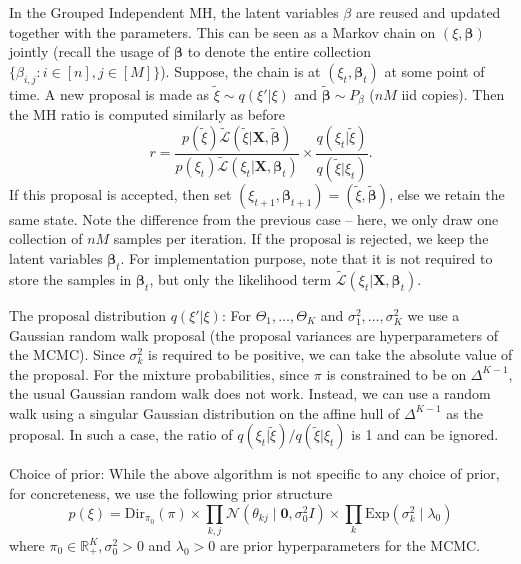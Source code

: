 \documentclass[bj,authoryear]{imsart}
\theoremstyle{plain}
\theoremstyle{remark}
\def\bX{\mathbf{X}}
\def\bbeta{{\boldsymbol\beta}}
\def\bbR{\mathbb{R}}
\def\cL{\mathcal{L}}
\def\cN{\mathcal{N}}
\begin{document}
\begin{appendix}
In the Grouped Independent MH, the latent variables $\beta$ are reused and updated together with the parameters. This can be seen as a Markov chain on $(\xi,\bbeta)$ jointly (recall the usage of $\bbeta$ to denote the entire collection $\{\beta_{i,j}:i\in[n],j\in[M]\}$). Suppose, the chain is at $(\xi_t, \bbeta_t)$ at some point of time. A new proposal is made as $\tilde{\xi}\sim q(\xi'|\xi)$ and $\tilde{\bbeta}\sim P_{\beta}$ ($nM$ iid copies). Then the MH ratio is computed similarly as before
$$r = \frac{p(\tilde{\xi})\tilde{\cL}(\tilde{\xi}|\bX,\tilde{\bbeta})}{p(\xi_t)\tilde{\cL}(\xi_t|\bX,\bbeta_t)}\times \frac{q(\xi_t|\tilde{\xi})}{q(\tilde{\xi}|\xi_t)}.$$
If this proposal is accepted, then set $(\xi_{t+1},\bbeta_{t+1})=(\tilde{\xi}, \tilde{\bbeta})$, else we retain the same state. Note the difference from the previous case -- here, we only draw one collection of $nM$ samples per iteration. If the proposal is rejected, we keep the latent variables $\bbeta_t$. For implementation purpose, note that it is not required to store the samples in $\bbeta_t$, but only the likelihood term $\tilde{\cL}(\xi_t|\bX,\bbeta_t)$.

The proposal distribution $q(\xi'|\xi)$: For $\Theta_1,\dots,\Theta_K$ and $\sigma_1^2,\dots,\sigma_K^2$ we use a Gaussian random walk proposal (the proposal variances are hyperparameters of the MCMC). Since $\sigma_k^2$ is required to be positive, we can take the absolute value of the proposal. For the mixture probabilities, since $\pi$ is constrained to be on $\Delta^{K-1}$, the usual Gaussian random walk does not work. Instead, we can use a random walk using a singular Gaussian distribution on the affine hull of $\Delta^{K-1}$ as the proposal. In such a case, the ratio of $q(\xi_t|\tilde{\xi})/q(\tilde{\xi}|\xi_t)$ is 1 and can be ignored.

Choice of prior: While the above algorithm is not specific to any choice of prior, for concreteness, we use the following prior structure
$$p(\xi) = \text{Dir}_{\pi_0}(\pi) \times \prod_{k,j} \cN(\theta_{kj}\mid \boldsymbol{0}, \sigma_0^2I)\times \prod_k \text{Exp}(\sigma_k^2 \mid \lambda_0)$$
where $\pi_0\in\bbR_+^K, \sigma_0^2>0$ and $\lambda_0>0$ are prior hyperparameters for the MCMC.


\end{appendix}
\end{document}
